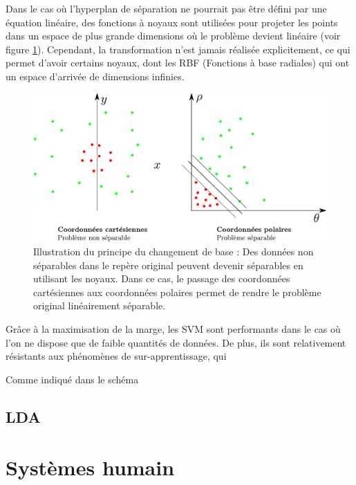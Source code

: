 Dans le cas où l'hyperplan de séparation ne pourrait pas être défini par une équation linéaire, des fonctions à noyaux sont utilisées pour projeter les points dans un espace de plus grande dimensions où le problème devient linéaire (voir figure \ref{fig:kernelTrick}). Cependant, la transformation n'est jamais réalisée explicitement, ce qui permet d'avoir certains noyaux, dont les RBF (Fonctions à base radiales) qui ont un espace d'arrivée de dimensions infinies.

\begin{figure}[h]
	\label{fig:kernelTrick}
	\begin{center}
	\includegraphics[width=15cm]{images/kernelTrick}
	\end{center}
	\caption{Illustration du principe du changement de base : Des données non séparables dans le repère original peuvent devenir séparables en utilisant les noyaux. Dans ce cas, le passage des coordonnées cartésiennes aux coordonnées polaires permet de rendre le problème original linéairement séparable.}
\end{figure}


Grâce à la maximisation de la marge, les SVM sont performants dans le cas où l'on ne dispose que de faible quantités de données. De plus, ils sont relativement résistants aux phénomènes de sur-apprentissage, qui

Comme indiqué dans le schéma 


		\subsection{LDA}

	\section{Systèmes humain}

